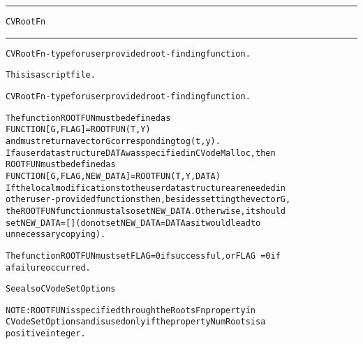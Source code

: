 \begin{samepage}
\hrule
\begin{center}
{\large \verb!CVRootFn!}
\label{p:CVRootFn}
\end{center}
\hrule\vspace{0.1in}



\begin{alltt}
CVRootFn - type for user provided root-finding function.
\end{alltt}

\end{samepage}



\begin{samepage}


\begin{alltt}
This is a script file. 
\end{alltt}

\end{samepage}



\begin{alltt}
CVRootFn - type for user provided root-finding function.

   The function ROOTFUN must be defined as 
        FUNCTION [G, FLAG] = ROOTFUN(T,Y)
   and must return a vector G corresponding to g(t,y).
   If a user data structure DATA was specified in CVodeMalloc, then
   ROOTFUN must be defined as
        FUNCTION [G, FLAG, NEW_DATA] = ROOTFUN(T,Y,DATA)
   If the local modifications to the user data structure are needed in
   other user-provided functions then, besides setting the vector G,
   the ROOTFUN function must also set NEW_DATA. Otherwise, it should 
   set NEW_DATA=[] (do not set NEW_DATA = DATA as it would lead to 
   unnecessary copying).

   The function ROOTFUN must set FLAG=0 if successful, or FLAG~=0 if
   a failure occurred.

   See also CVodeSetOptions

   NOTE: ROOTFUN is specified through the RootsFn property in
   CVodeSetOptions and is used only if the property NumRoots is a
   positive integer.
\end{alltt}






\vspace{0.1in}